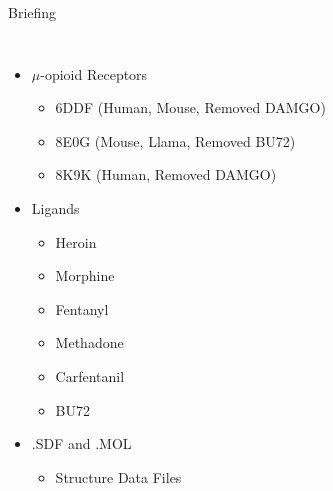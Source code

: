 \documentclass{beamer}
\begin{document}
\begin{frame}{Briefing}
    \begin{columns}
            \begin{itemize}
                \item $\mu$-opioid Receptors
                \begin{itemize} \scriptsize
                    \item 6DDF (Human, Mouse, Removed DAMGO)
                    \item 8E0G (Mouse, Llama, Removed BU72)
                    \item 8K9K (Human, Removed DAMGO)
                \end{itemize}
                \item Ligands
                \begin{itemize} \footnotesize
                    \item Heroin
                    \item Morphine
                    \item Fentanyl
                    \item Methadone
                    \item Carfentanil
                    \item BU72
                \end{itemize}
                \item .SDF and .MOL
                \begin{itemize} \footnotesize
                    \item Structure Data Files
                \end{itemize}
            \end{itemize}
        \end{columns}
        
\end{frame}
\end{document}
